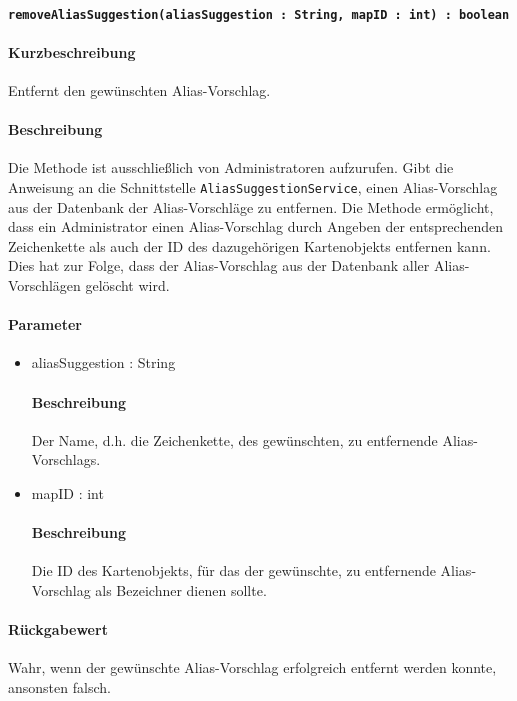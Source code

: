 \paragraph{\texttt{removeAliasSuggestion(aliasSuggestion : String, mapID : int) : boolean}}%
\paragraph*{Kurzbeschreibung}
Entfernt den gewünschten Alias-Vorschlag.
\paragraph*{Beschreibung}
Die Methode ist ausschließlich von Administratoren aufzurufen.
Gibt die Anweisung an die Schnittstelle \texttt{AliasSuggestionService}, einen Alias-Vorschlag aus der Datenbank der Alias-Vorschläge zu entfernen.
Die Methode ermöglicht, dass ein Administrator einen Alias-Vorschlag durch Angeben der entsprechenden Zeichenkette als auch der ID des dazugehörigen Kartenobjekts entfernen kann.
Dies hat zur Folge, dass der Alias-Vorschlag aus der Datenbank aller Alias-Vorschlägen gelöscht wird.
\paragraph*{Parameter}
\begin{itemize}
	\item aliasSuggestion : String
		\paragraph*{Beschreibung}
		Der Name, d.h. die Zeichenkette, des gewünschten, zu entfernende Alias-Vorschlags.
	\item mapID : int
		\paragraph*{Beschreibung}
		Die ID des Kartenobjekts, für das der gewünschte, zu entfernende Alias-Vorschlag als Bezeichner dienen sollte.
\end{itemize}
\paragraph*{Rückgabewert}
Wahr, wenn der gewünschte Alias-Vorschlag erfolgreich entfernt werden konnte, ansonsten falsch.
